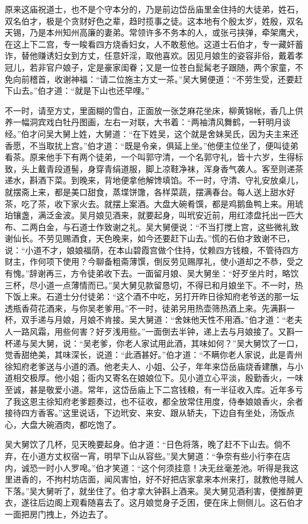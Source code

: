 原来这庙祝道士，也不是个守本分的，乃是前边岱岳庙里金住持的大徒弟，姓石，双名伯才，极是个贪财好色之辈，趋时揽事之徒。这本地有个殷太岁，姓殷，双名天锡，乃是本州知州高廉的妻弟。常领许多不务本的人，或张弓挟弹，牵架鹰犬，在这上下二宫，专一睃看四方烧香妇女，人不敢惹他。这道士石伯才，专一藏奸蓄诈，替他赚诱妇女到方丈，任意奸淫，取他喜欢。因见月娘生的姿容非俗，戴着孝冠儿，若非官户娘子，定是豪家闺眷；又是一位苍白髭髯老子跟随，两个家童，不免向前稽首，收谢神福：“请二位施主方丈一茶。”吴大舅便道：“不劳生受，还要赶下山去。”伯才道：“就是下山也还早哩。”

不一时，请至方丈，里面糊的雪白，正面放一张芝麻花坐床，柳黄锦帐，香几上供养一幅洞宾戏白牡丹图画，左右一对联，大书着：“两袖清风舞鹤，一轩明月谈经。”伯才问吴大舅上姓，大舅道：“在下姓吴，这个就是舍妹吴氏，因为夫主来还香愿，不当取扰上宫。”伯才道：“既是令亲，俱延上坐。”他便主位坐了，便叫徒弟看茶。原来他手下有两个徒弟，一个叫郭守清，一个名郭守礼，皆十六岁，生得标致，头上戴青段道髻，身穿青绢道服，脚上凉鞋净袜，浑身香气袭人。客至则递茶递水，斟酒下菜。到晚来，背地便拿他解馋填馅。不一时，守清、守礼安放桌儿，就摆斋上来，都是美口甜食，蒸堞饼馓，各样菜蔬，摆满春台。每人送上甜水好茶，吃了茶，收下家火去。就摆上案酒。大盘大碗肴馔，都是鸡鹅鱼鸭上来。用琥珀镶盏，满泛金波。吴月娘见酒来，就要起身，叫玳安近前，用红漆盘托出一匹大布、二两白金，与石道士作致谢之礼。吴大舅便说：“不当打搅上宫，这些微礼致谢仙长。不劳见赐酒食，天色晚来，如今还要赶下山去。”慌的石伯才致谢不已，说：“小道不才，娘娘福荫，在本山碧霞宫做个住持，仗赖四方钱粮，不管待四方财主，作何项下使用？今聊备粗斋薄馔，倒反劳见赐厚礼，使小道却之不恭，受之有愧。”辞谢再三，方令徒弟收下去。一面留月娘、吴大舅坐：“好歹坐片时，略饮三杯，尽小道一点薄情而已。”吴大舅见款留恳切，不得已和月娘坐下。不一时，热下饭上来。石道士分付徒弟：“这个酒不中吃，另打开昨日徐知府老爷送的那一坛透瓶香荷花酒来，与你吴老爹用。”不一时，徒弟另用热壶筛热酒上来。先满斟一杯，双手递与月娘，月娘不肯接。吴大舅道：“舍妹他天性不用酒。”伯才道：“老夫人一路风霜，用些何害？好歹浅用些。”一面倒去半钟，递上去与月娘接了。又斟一杯递与吴大舅，说：“吴老爹，你老人家试用此酒，其味如何？”吴大舅饮了一口，觉香甜绝美，其味深长，说道：“此酒甚好。”伯才道：“不瞒你老人家说，此是青州徐知府老爹送与小道的酒。他老夫人、小姐、公子，年年来岱岳庙烧香建醮，与小道相交极厚。他小姐；衙内又寄名在娘娘位下。见小道立心平淡，殷勤香火，一味至诚，甚是敬爱小道。常年，这岱岳庙上下二宫钱粮，有一半征收入库。近年多亏了我这恩主徐知府老爹题奏过，也不征收，都全放常住用度，侍奉娘娘香火，余者接待四方香客。”这里说话，下边玳安、来安、跟从轿夫，下边自有坐处，汤饭点心，大盘大碗酒肉，都吃饱了。

吴大舅饮了几杯，见天晚要起身。伯才道：“日色将落，晚了赶不下山去。倘不弃，在小道方丈权宿一宵，明早下山从容些。”吴大舅道：“争奈有些小行李在店内，诚恐一时小人罗唣。”伯才笑道：“这个何须挂意！决无丝毫差池。听得是我这里进香的，不拘村坊店面，闻风害怕，好不好把店家拿来本州来打，就教他寻贼人下落。”吴大舅听了，就坐住了。伯才拿大钟斟上酒来。吴大舅见酒利害，便推醉更衣，遂往后边阁上观看随喜去了。这月娘觉身子乏困，便在床上侧侧儿。这石伯才一面把房门拽上，外边去了。

